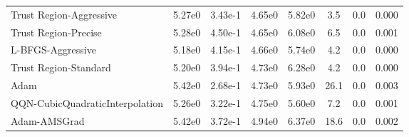 \documentclass{article}
\begin{document}
\begin{table}[htbp]
{\begin{tabular}{p{2.5cm}*{7}{c}}
Trust Region-Aggressive & 5.27e0 & 3.43e-1 & 4.65e0 & 5.82e0 & 3.5 & 0.0 & 0.000 \\
Trust Region-Precise & 5.28e0 & 4.50e-1 & 4.65e0 & 6.08e0 & 6.5 & 0.0 & 0.001 \\
L-BFGS-Aggressive & 5.18e0 & 4.15e-1 & 4.66e0 & 5.74e0 & 4.2 & 0.0 & 0.000 \\
Trust Region-Standard & 5.20e0 & 3.94e-1 & 4.73e0 & 6.28e0 & 4.2 & 0.0 & 0.000 \\
Adam & 5.42e0 & 2.68e-1 & 4.73e0 & 5.93e0 & 26.1 & 0.0 & 0.003 \\
QQN-CubicQuadraticInterpolation & 5.26e0 & 3.22e-1 & 4.75e0 & 5.60e0 & 7.2 & 0.0 & 0.001 \\
Adam-AMSGrad & 5.42e0 & 3.72e-1 & 4.94e0 & 6.37e0 & 18.6 & 0.0 & 0.002 \\
\bottomrule
\end{tabular}
}
\end{table}
\end{document}
